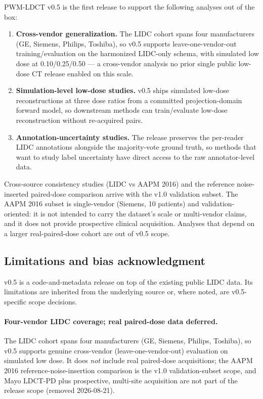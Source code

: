 \documentclass[twoside,11pt]{article}
\begin{document}
PWM-LDCT v0.5 is the first release to support the following analyses out of the box:

\begin{enumerate}
    \item \textbf{Cross-vendor generalization.} The LIDC cohort spans four manufacturers (GE, Siemens, Philips, Toshiba), so v0.5 supports leave-one-vendor-out training/evaluation on the harmonized LIDC-only schema, with simulated low dose at 0.10/0.25/0.50 --- a cross-vendor analysis no prior single public low-dose CT release enabled on this scale.
    \item \textbf{Simulation-level low-dose studies.} v0.5 ships simulated low-dose reconstructions at three dose ratios from a committed projection-domain forward model, so downstream methods can train/evaluate low-dose reconstruction without re-acquired pairs.
    \item \textbf{Annotation-uncertainty studies.} The release preserves the per-reader LIDC annotations alongside the majority-vote ground truth, so methods that want to study label uncertainty have direct access to the raw annotator-level data.
\end{enumerate}

Cross-source consistency studies (LIDC vs AAPM 2016) and the reference noise-inserted paired-dose comparison arrive with the v1.0 validation subset. The AAPM 2016 subset is single-vendor (Siemens, 10 patients) and validation-oriented: it is not intended to carry the dataset's scale or multi-vendor claims, and it does not provide prospective clinical acquisition. Analyses that depend on a larger real-paired-dose cohort are out of v0.5 scope.

\subsection*{Limitations and bias acknowledgment}

v0.5 is a code-and-metadata release on top of the existing public LIDC data. Its limitations are inherited from the underlying source or, where noted, are v0.5-specific scope decisions.

\paragraph{Four-vendor LIDC coverage; real paired-dose data deferred.} The LIDC cohort spans four manufacturers (GE, Siemens, Philips, Toshiba), so v0.5 supports genuine cross-vendor (leave-one-vendor-out) evaluation on simulated low dose. It does \emph{not} include real paired-dose acquisitions; the AAPM 2016 reference-noise-insertion comparison is the v1.0 validation-subset scope, and Mayo LDCT-PD plus prospective, multi-site acquisition are not part of the release scope (removed 2026-08-21).
\end{document}
